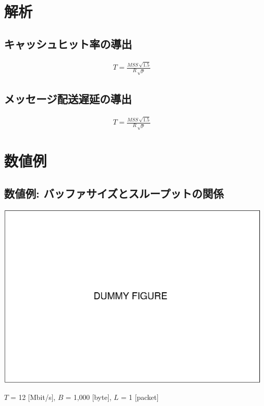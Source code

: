 \documentclass[compress,dvipdfmx,11pt]{beamer}
\begin{document}
\section{解析}
\label{sec:orga3ea564}

\subsection{キャッシュヒット率の導出}
\label{sec:org7c86458}

\begin{align}
T = \frac{MSS \, \sqrt{1.5}}{R \, \sqrt{p}}
\end{align}

\subsection{メッセージ配送遅延の導出}
\label{sec:orgd1e7870}

\begin{align}
T = \frac{MSS \, \sqrt{1.5}}{R \, \sqrt{p}}
\end{align}

\section{数値例}
\label{sec:org7b90d07}

\subsection{数値例: バッファサイズとスループットの関係}
\label{sec:org8cd67ae}

\begin{center}
\begin{center}
\includegraphics[width=.7\columnwidth]{./figure/dummy.eps}
\end{center}
\end{center}

\begin{center}
\(T\) = 12 [Mbit/s], \(B\) = 1,000 [byte], \(L\) = 1 [packet]
\end{center}
\end{document}
